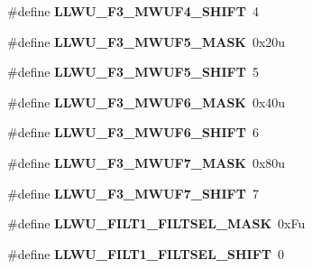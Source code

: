 \begin{DoxyCompactItemize}
\#define {\bfseries L\+L\+W\+U\+\_\+\+F3\+\_\+\+M\+W\+U\+F4\+\_\+\+S\+H\+I\+FT}~4
\item 
\mbox{\label{group___l_l_w_u___register___masks_gaeb14754fa2d5b4c1fd50b9df98f11b01}} 
\#define {\bfseries L\+L\+W\+U\+\_\+\+F3\+\_\+\+M\+W\+U\+F5\+\_\+\+M\+A\+SK}~0x20u
\item 
\mbox{\label{group___l_l_w_u___register___masks_gac8a9d2de72a5034fae66714d25aa5f33}} 
\#define {\bfseries L\+L\+W\+U\+\_\+\+F3\+\_\+\+M\+W\+U\+F5\+\_\+\+S\+H\+I\+FT}~5
\item 
\mbox{\label{group___l_l_w_u___register___masks_gabd1f915448c7918a8aabc74239d7e773}} 
\#define {\bfseries L\+L\+W\+U\+\_\+\+F3\+\_\+\+M\+W\+U\+F6\+\_\+\+M\+A\+SK}~0x40u
\item 
\mbox{\label{group___l_l_w_u___register___masks_gaab649d98d5d8eb9f2f272649ace225c4}} 
\#define {\bfseries L\+L\+W\+U\+\_\+\+F3\+\_\+\+M\+W\+U\+F6\+\_\+\+S\+H\+I\+FT}~6
\item 
\mbox{\label{group___l_l_w_u___register___masks_ga2ddb11dc5e9f8a8404ccf99f10046b5a}} 
\#define {\bfseries L\+L\+W\+U\+\_\+\+F3\+\_\+\+M\+W\+U\+F7\+\_\+\+M\+A\+SK}~0x80u
\item 
\mbox{\label{group___l_l_w_u___register___masks_gaee31def5b074844cbf46f9d7e54d2d4f}} 
\#define {\bfseries L\+L\+W\+U\+\_\+\+F3\+\_\+\+M\+W\+U\+F7\+\_\+\+S\+H\+I\+FT}~7
\item 
\mbox{\label{group___l_l_w_u___register___masks_gaa44e21d07f509d1f5d6cec9da32ab8ab}} 
\#define {\bfseries L\+L\+W\+U\+\_\+\+F\+I\+L\+T1\+\_\+\+F\+I\+L\+T\+S\+E\+L\+\_\+\+M\+A\+SK}~0x\+Fu
\item 
\mbox{\label{group___l_l_w_u___register___masks_gaab2a7991b2b135f0557b1b41cc3528f7}} 
\#define {\bfseries L\+L\+W\+U\+\_\+\+F\+I\+L\+T1\+\_\+\+F\+I\+L\+T\+S\+E\+L\+\_\+\+S\+H\+I\+FT}~0
\item 
\mbox{\label{group___l_l_w_u___register___masks_ga9d7876a517542c2fa363b9f15d375d69}} 

\end{DoxyCompactItemize}
